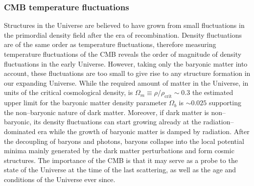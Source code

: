 \documentclass[paper=a4, fontsize=11pt]{scrartcl} %
\numberwithin{equation}{section} %
\numberwithin{figure}{section} %
\numberwithin{table}{section} %
\newcommand{\ignore}[1]{}
\begin{document}



\subsubsection{CMB temperature fluctuations}
\label{subsec:CMB}
\ignore{One very convincing evidence for the presence and amount of dark matter in our Universe is from the fluctuations of the CMB. Quote the cosmological density fractions for dark matter, baryon, and the Hubble constant for the latest Planck paper.}
Structures in the Universe are believed to have grown from small fluctuations in the primordial density field after the era of recombination. Density fluctuations are of the same order as temperature fluctuations\ignore{ ({\bf cite!}) \bf why? look back in the structure formation part!}, therefore measuring temperature fluctuations of the CMB reveals the order of magnitude of density fluctuations in the early Universe. However, taking only the baryonic matter into account, these fluctuations are too small to give rise to any structure formation in our expanding Universe. While the required amount of matter in the Universe, in units of the critical cosmological density, is $\Omega_m \equiv \rho/\rho_\mathrm{crit}\sim 0.3$ the estimated upper limit for the baryonic matter density parameter $\Omega_b$ is $ \sim 0.025$ \citep[][]{Planck2015} supporting the non--baryonic nature of dark matter. Moreover, if dark matter is non--baryonic, its density fluctuations can start growing already at the radiation--dominated era while the growth of baryonic matter is damped by radiation. After the decoupling of baryons and photons, baryons collapse into the local potential minima mainly generated by the dark matter perturbations and form cosmic structures. The importance of the CMB is that it may serve as a probe to the state of the Universe at the time of the last scattering, as well as the age and conditions of the Universe ever since.
\end{document}
